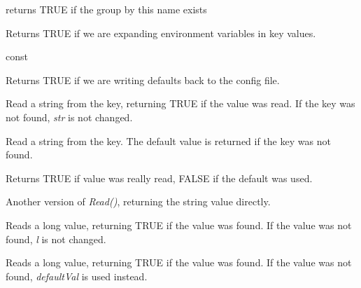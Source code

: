 \label{wxconfigbasehasgroup}


returns TRUE if the group by this name exists

\label{wxconfigbaseisexpandingenvvars}


Returns TRUE if we are expanding environment variables in key values.

\label{wxconfigbaseisrecordingdefaults}

 const

Returns TRUE if we are writing defaults back to the config file.

\label{wxconfigbaseread}


Read a string from the key, returning TRUE if the value was read. If the key was not
found, {\it str} is not changed.


Read a string from the key. The default value is returned if the key was not found.

Returns TRUE if value was really read, FALSE if the default was used.


Another version of {\it Read()}, returning the string value directly.


Reads a long value, returning TRUE if the value was
found. If the value was not found, {\it l} is not changed.


Reads a long value, returning TRUE if the value was
found. If the value was not found, {\it defaultVal} is used instead.


